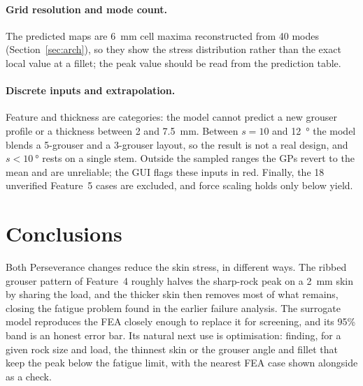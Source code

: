 \documentclass[11pt,a4paper]{article}
\begin{document}
\paragraph{Grid resolution and mode count.} The predicted maps are \SI{6}{mm} cell maxima reconstructed from 40 modes (Section~\ref{sec:arch}), so they show the stress distribution rather than the exact local value at a fillet; the peak value should be read from the prediction table.

\paragraph{Discrete inputs and extrapolation.} Feature and thickness are categories: the model cannot predict a new grouser profile or a thickness between 2 and \SI{7.5}{mm}. Between $s = 10$ and \SI{12}{\degree} the model blends a 5-grouser and a 3-grouser layout, so the result is not a real design, and $s < \SI{10}{\degree}$ rests on a single stem. Outside the sampled ranges the GPs revert to the mean and are unreliable; the GUI flags these inputs in red. Finally, the 18 unverified Feature~5 cases are excluded, and force scaling holds only below yield.

\section{Conclusions}

Both Perseverance changes reduce the skin stress, in different ways. The ribbed grouser pattern of Feature~4 roughly halves the sharp-rock peak on a \SI{2}{mm} skin by sharing the load, and the thicker skin then removes most of what remains, closing the fatigue problem found in the earlier failure analysis. The surrogate model reproduces the FEA closely enough to replace it for screening, and its 95\% band is an honest error bar. Its natural next use is optimisation: finding, for a given rock size and load, the thinnest skin or the grouser angle and fillet that keep the peak below the fatigue limit, with the nearest FEA case shown alongside as a check.

\end{document}
